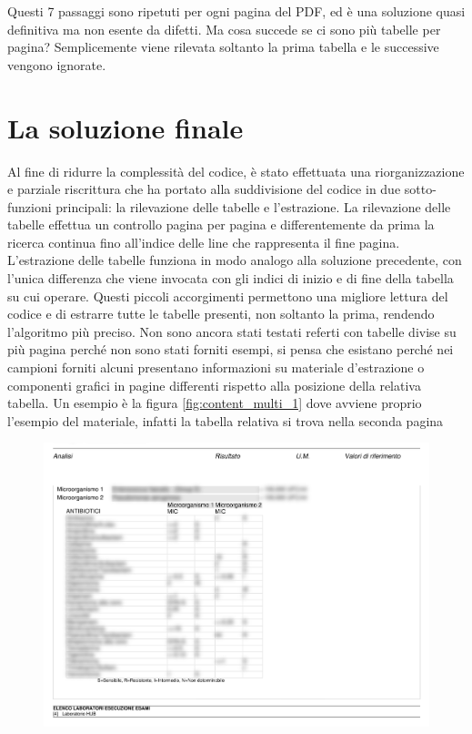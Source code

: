 Questi 7 passaggi sono ripetuti per ogni pagina del PDF, ed è una soluzione quasi definitiva ma non esente da difetti. Ma cosa succede se ci sono più tabelle per pagina? Semplicemente viene rilevata soltanto la prima tabella e le successive vengono ignorate.
\section{La soluzione finale}
Al fine di ridurre la complessità del codice, è stato effettuata una riorganizzazione e parziale riscrittura che ha portato alla suddivisione del codice in due sotto-funzioni principali: la rilevazione delle tabelle e l'estrazione.
La rilevazione delle tabelle effettua un controllo pagina per pagina e differentemente da prima la ricerca continua fino all'indice delle line che rappresenta il fine pagina.
L'estrazione delle tabelle funziona in modo analogo alla soluzione precedente, con l'unica differenza che viene invocata con gli indici di inizio e di fine della tabella su cui operare. 
Questi piccoli accorgimenti permettono una migliore lettura del codice e di estrarre tutte le tabelle presenti, non soltanto la prima, rendendo l'algoritmo più preciso.
Non sono ancora stati testati referti con tabelle divise su più pagina perché non sono stati forniti esempi, si pensa che esistano perché nei campioni forniti alcuni presentano informazioni su materiale d'estrazione o componenti grafici in pagine differenti rispetto alla posizione della relativa tabella. Un esempio è la figura \ref{fig:content_multi_1} dove avviene proprio l'esempio del materiale, infatti la tabella relativa si trova nella seconda pagina 
\newpage
\begin{figure}[h!]
	\centering
	\includegraphics[width=.99\columnwidth]{images/content_multi_p2.png}
	\caption{\textit{}}
	\label{fig:content_multi_2}
\end{figure} 

